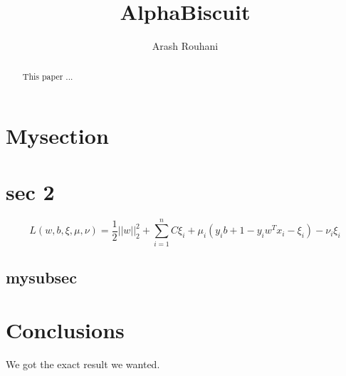 \documentclass[a4paper,11pt]{article}
\title{AlphaBiscuit}
\author{Arash Rouhani}
\begin{document}
\maketitle

\begin{abstract}
This paper ...

\end{abstract}

\section{Mysection}
\section{sec 2}
\begin{equation}
L(w, b, \xi, \mu, \nu) = \frac{1}{2} ||w||^2_2 + \sum\limits_{i=1}^n {C\xi_i + \mu_i(y_ib + 1 - y_iw^Tx_i - \xi_i) - \nu_i\xi_i}
\end{equation}

\subsection{mysubsec}
\section{Conclusions}
We got the exact result we wanted.
\end{document}
